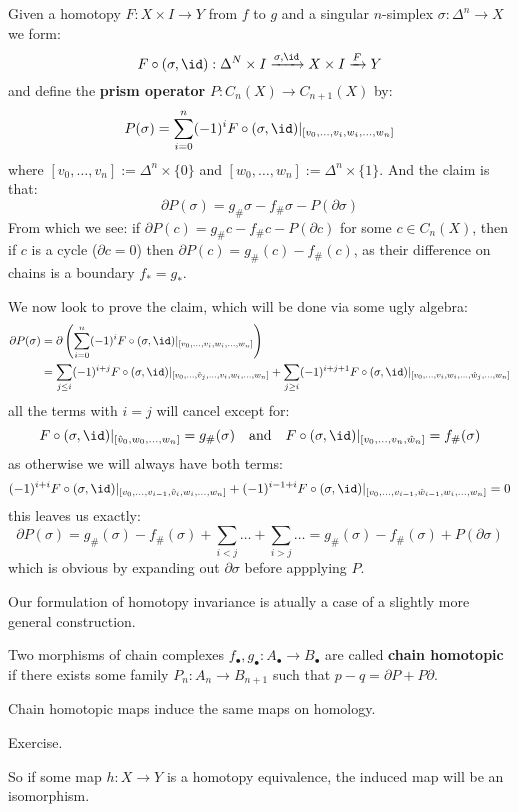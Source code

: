 \documentclass[a4paper]{article}
\begin{document}
\begin{thrm}
\begin{prf}
Given a homotopy $F:X\times I\rightarrow Y$ from $f$ to $g$ and a singular $n$-simplex $\sigma:\Delta^n\rightarrow X$ we form:\[
    F\circ(\sigma,\id):\Delta^N\times I \xrightarrow{\sigma,\id} X\times I \xrightarrow{F} Y
\]
and define the \textbf{prism operator} $P:C_n(X)\rightarrow C_{n+1}(X)$ by:\[
    P(\sigma)=\sum_{i=0}^n (-1)^i F\circ(\sigma,\id)\vert_{[v_0,\ldots,v_i,w_i,\ldots,w_n]}
\]
where $[v_0,\ldots,v_n]:= \Delta^n\times\{0\}$ and $[w_0,\ldots,w_n]:= \Delta^n\times\{1\}$.
And the claim is that: \[
    \partial P(\sigma) = g_\#\sigma-f_\#\sigma-P(\partial\sigma)
\]
From which we see: if $\partial P(c) = g_\#c-f_\#c-P(\partial c)$ for some $c\in C_n(X)$, then if $c$ is a cycle ($\partial c=0$) then $\partial P(c) = g_\#(c)-f_\#(c)$, as their difference on chains is a boundary $f_*=g_*$.

We now look to prove the claim, which will be done via some ugly algebra:\begin{align*}
    \partial P(\sigma) &= \partial\pr{\sum_{i=0}^n (-1)^i F\circ(\sigma,\id)\vert_{[v_0,\ldots,v_i,w_i,\ldots,w_n]}} \\
    &= \sum_{j\leq i} (-1)^{i+j } F\circ(\sigma,\id)\vert_{[v_0,\ldots,\hat{v}_j,\ldots,v_i,w_i,\ldots,w_n]} + 
    \sum_{j\geq i} (-1)^{i+j+1} F\circ(\sigma,\id)\vert_{[v_0,\ldots,v_i,w_i,\ldots,\hat{w}_j,\ldots,w_n]}
\end{align*}
all the terms with $i=j$ will cancel except for:\[
    F\circ(\sigma,\id)\vert_{[\hat{v}_0,w_0,\ldots,w_n]} =g_\#(\sigma)
    \quad \text{and} \quad 
    F\circ(\sigma,\id)\vert_{[v_0,\ldots,v_n,\hat{w}_n]} = f_\#(\sigma)
\]
as otherwise we will always have both terms:\[
    (-1)^{i+i}F\circ(\sigma,\id)\vert_{[v_0,\ldots,v_{i-1},\hat{v}_i,w_i,\ldots,w_n]} + 
    (-1)^{i-1+i}F\circ(\sigma,\id)\vert_{[v_0,\ldots,v_{i-1},\hat{w}_{i-1},w_i,\ldots,w_n]} = 0
\]
this leaves us exactly:\[
    \partial P(\sigma) = g_\#(\sigma) - f_\#(\sigma) + \sum_{i<j}\ldots + \sum_{i>j}\ldots = g_\#(\sigma)-f_\#(\sigma) + P(\partial \sigma)
\]
which is obvious by expanding out $\partial \sigma$ before appplying $P$.
\end{prf}
\end{thrm}
Our formulation of homotopy invariance is atually a case of a slightly more general construction.
\begin{dfn}
    Two morphisms of chain complexes $f_\bullet,g_\bullet:A_\bullet\rightarrow B_\bullet$ are called \textbf{chain homotopic} if there exists some family $P_n:A_n\rightarrow B_{n+1}$ such that $p-q = \partial P + P\partial$. %
\end{dfn}
\begin{prop}
    Chain homotopic maps induce the same maps on homology.
    \begin{prf}
        Exercise.
    \end{prf}
\end{prop}
So if some map $h:X\rightarrow Y$ is a homotopy equivalence, the induced map will be an isomorphism.
\end{document}
